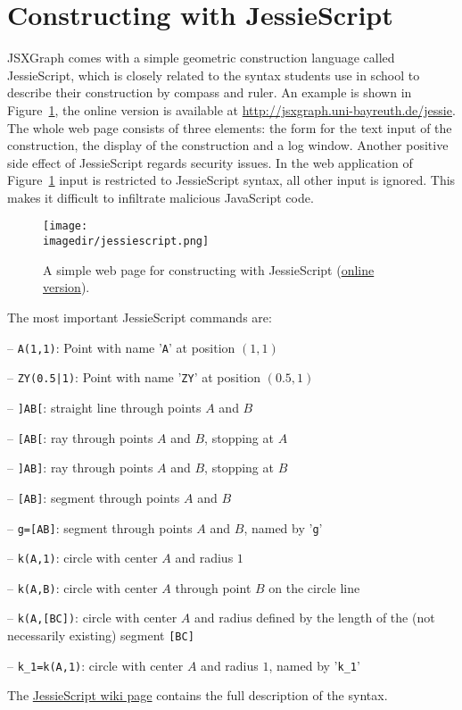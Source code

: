\documentclass[12pt,a4paper]{article}%
\newcommand{\imagedir}{pics}
\begin{document}
\section{Constructing with JessieScript}
JSXGraph comes with a simple geometric construction language called JessieScript, which is closely related to the syntax students use in school to describe their construction by compass and ruler. An example is shown in Figure~\ref{fig:jessiescript}, the online version is available at 
\href{http://jsxgraph.uni-bayreuth.de/jessie}{http://jsxgraph.uni-bayreuth.de/jessie}. 
The whole web page consists of three elements: the form for the text input of the construction, the display of the construction and a log window. 
Another positive side effect of JessieScript regards security issues. 
In the web application of Figure~\ref{fig:jessiescript}
input is restricted to 
JessieScript syntax, all other input is ignored. This makes it difficult to 
infiltrate malicious JavaScript code.
\begin{figure}[ht]
\begin{center}
\texttt{[image: \\imagedir/jessiescript.png]}\\
\caption{A simple web page for constructing with JessieScript 
(\href{http://jsxgraph.uni-bayreuth.de/jessie/}{online version}).}\label{fig:jessiescript}
\end{center}
\end{figure}

The most important JessieScript commands are:
\begin{description}
\item{-- \verb+A(1,1)+:} Point with name '\verb|A|' at position $(1,1)$
\item{-- \verb+ZY(0.5|1)+:} Point with name '\verb|ZY|' at position $(0.5,1)$
\item{-- \verb|]AB[|:} straight line through points $A$ and $B$
\item{-- \verb|[AB[|:} ray through points $A$ and $B$, stopping at $A$
\item{-- \verb|]AB]|:} ray through points $A$ and $B$, stopping at $B$
\item{-- \verb|[AB]|:} segment through points $A$ and $B$
\item{-- \verb|g=[AB]|:} segment through points $A$ and $B$, named by '\verb|g|'
\item{-- \verb|k(A,1)|:} circle with center $A$ and radius $1$
\item{-- \verb|k(A,B)|:} circle with center $A$ through point $B$ on the circle line
\item{-- \verb|k(A,[BC])|:} circle with center $A$ and radius defined by the length of the 
(not necessarily existing) segment \verb|[BC]|
\item{-- \verb|k_1=k(A,1)|:} circle with center $A$ and radius $1$, named by '\verb|k_1|' 
\end{description}
The \href{http://jsxgraph.uni-bayreuth.de/wiki/index.php/Geometric_constructions_with_JessieScript}{JessieScript wiki page} contains the full description of the syntax.
\end{document}
